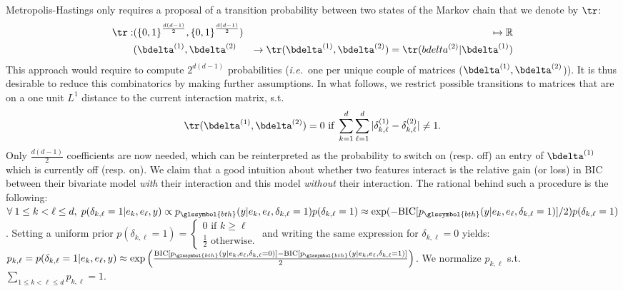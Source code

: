 Metropolis-Hastings only requires a proposal of a transition probability between two states of the Markov chain that we denote by $\tr$:
\begin{align*}
\tr: & ({\{0,1\}}^{\frac{d(d-1)}{2}},{\{0,1\}}^{\frac{d(d-1)}{2}}) & \mapsto \mathbb{R} \\
& (\bdelta^{(1)},\bdelta^{(2)} & \to \tr(\bdelta^{(1)},\bdelta^{(2)}) = \tr(bdelta^{(2)} | \bdelta^{(1)})
\end{align*}
This approach would require to compute $2^{d(d-1)}$ probabilities (\textit{i.e.}\ one per unique couple of matrices ($\bdelta^{(1)},\bdelta^{(2)}$)). It is thus desirable to reduce this combinatorics by making further assumptions. In what follows, we restrict possible transitions to matrices that are on a one unit $L^1$ distance to the current interaction matrix, s.t.\ 
\[ \tr(\bdelta^{(1)},\bdelta^{(2)}) = 0 \text{ if } \sum_{k=1}^d \sum_{\ell=1}^d |\delta^{(1)}_{k,\ell} - \delta^{(2)}_{k,\ell}| \neq 1. \]
Only $\frac{d(d-1)}{2}$ coefficients are now needed, which can be reinterpreted as the probability to switch on (resp. off) an entry of $\bdelta^{(1)}$ which is currently off (resp. on). We claim that a good intuition about whether two features interact is the relative gain (or loss) in BIC between their bivariate model \textit{with} their interaction and this model \textit{without} their interaction. The rational behind such a procedure is the following: $\forall \: 1 \leq k < \ell \leq d, \; p(\delta_{k,\ell}=1 | e_k, e_{\ell}, y) \propto p_{\glssymbol{bth}}(y | e_k, e_{\ell}, \delta_{k,\ell}=1) p(\delta_{k,\ell}=1) \approx \exp(-\text{BIC}[p_{\glssymbol{bth}}(y | e_k, e_{\ell}, \delta_{k,\ell}=1)]/2) p(\delta_{k,\ell}=1)$. Setting a uniform prior $p(\delta_{k,\ell}=1) =\begin{cases} 0 \text{ if } k \geq \ell \\ \frac{1}{2} \text{ otherwise.} \end{cases}$ and writing the same expression for $\delta_{k,\ell} = 0$ yields: $p_{k,\ell} = p(\delta_{k,\ell}=1 | e_k, e_{\ell}, y) \approx \exp \left( \frac{\text{BIC}[p_{\glssymbol{bth}}(y | e_k, e_{\ell}, \delta_{k,\ell}=0)]-\text{BIC}[p_{\glssymbol{bth}}(y | e_k, e_{\ell}, \delta_{k,\ell}=1)]}{2} \right)$. We normalize $p_{k,\ell}$ s.t.\ $\sum_{1 \leq k < \ell \leq d} p_{k,\ell} = 1$.

